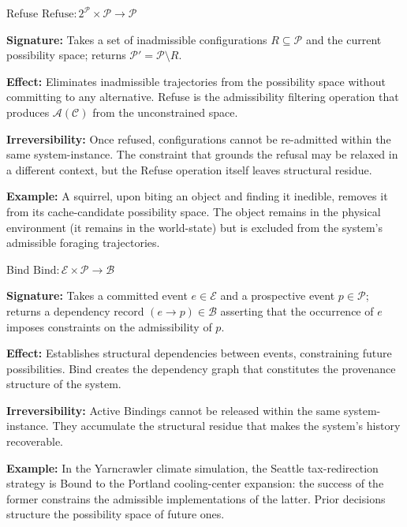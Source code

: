 \begin{definition}{Refuse}
$\mathrm{Refuse}: 2^\mathcal{P} \times \mathcal{P} \to \mathcal{P}$

\textbf{Signature:} Takes a set of inadmissible configurations $R \subseteq
\mathcal{P}$ and the current possibility space; returns $\mathcal{P}' =
\mathcal{P} \setminus R$.

\textbf{Effect:} Eliminates inadmissible trajectories from the possibility space
without committing to any alternative. Refuse is the admissibility filtering
operation that produces $\mathcal{A}(\mathcal{C})$ from the unconstrained space.

\textbf{Irreversibility:} Once refused, configurations cannot be re-admitted
within the same system-instance. The constraint that grounds the refusal may be
relaxed in a different context, but the Refuse operation itself leaves structural
residue.

\textbf{Example:} A squirrel, upon biting an object and finding it inedible,
removes it from its cache-candidate possibility space. The object remains in
the physical environment (it remains in the world-state) but is excluded from
the system's admissible foraging trajectories.
\end{definition}

\begin{definition}{Bind}
$\mathrm{Bind}: \mathcal{E} \times \mathcal{P} \to \mathcal{B}$

\textbf{Signature:} Takes a committed event $e \in \mathcal{E}$ and a prospective
event $p \in \mathcal{P}$; returns a dependency record $(e \to p) \in \mathcal{B}$
asserting that the occurrence of $e$ imposes constraints on the admissibility of $p$.

\textbf{Effect:} Establishes structural dependencies between events, constraining
future possibilities. Bind creates the dependency graph that constitutes the
provenance structure of the system.

\textbf{Irreversibility:} Active Bindings cannot be released within the same
system-instance. They accumulate the structural residue that makes the system's
history recoverable.

\textbf{Example:} In the Yarncrawler climate simulation, the Seattle tax-redirection
strategy is Bound to the Portland cooling-center expansion: the success of the
former constrains the admissible implementations of the latter. Prior decisions
structure the possibility space of future ones.
\end{definition}

